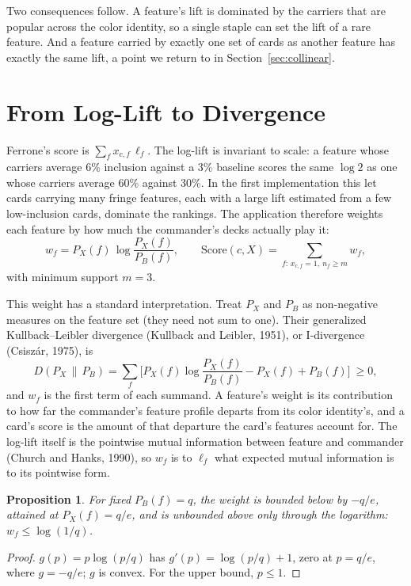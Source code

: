 \documentclass[11pt]{article}
\newtheorem{proposition}{Proposition}
\theoremstyle{remark}
\begin{document}
\noindent Two consequences follow. A feature's lift is dominated by the carriers
that are popular across the color identity, so a single staple can set the lift
of a rare feature. And a feature carried by exactly one set of cards as another
feature has exactly the same lift, a point we return to in
Section~\ref{sec:collinear}.

\section{From Log-Lift to Divergence}\label{sec:div}
\noindent Ferrone's score is $\sum_f x_{c,f}\,\ell_f$. The log-lift is invariant
to scale: a feature whose carriers average 6\% inclusion against a 3\% baseline
scores the same $\log 2$ as one whose carriers average 60\% against 30\%. In the
first implementation this let cards carrying many fringe features, each with a
large lift estimated from a few low-inclusion cards, dominate the rankings. The
application therefore weights each feature by how much the commander's decks
actually play it:
\begin{equation}\label{eq:weight}
  w_f = P_X(f)\,\log\frac{P_X(f)}{P_B(f)},\qquad
  \mathrm{Score}(c,X)=\sum_{f:\,x_{c,f}=1,\ n_f\ge m} w_f ,
\end{equation}
with minimum support $m=3$.

This weight has a standard interpretation. Treat $P_X$ and $P_B$ as non-negative
measures on the feature set (they need not sum to one). Their generalized
Kullback--Leibler divergence (Kullback and Leibler, 1951), or I-divergence
(Csisz\'ar, 1975), is
\begin{equation}\label{eq:idiv}
  D(P_X\,\|\,P_B)=\sum_f\Big[P_X(f)\log\frac{P_X(f)}{P_B(f)}-P_X(f)+P_B(f)\Big]\ \ge 0 ,
\end{equation}
and $w_f$ is the first term of each summand. A feature's weight is its
contribution to how far the commander's feature profile departs from its color
identity's, and a card's score is the amount of that departure the card's
features account for. The log-lift itself is the pointwise mutual information
between feature and commander (Church and Hanks, 1990), so $w_f$ is to $\ell_f$
what expected mutual information is to its pointwise form.

\begin{proposition}\label{prop:bound}
For fixed $P_B(f)=q$, the weight is bounded below by $-q/e$, attained at
$P_X(f)=q/e$, and is unbounded above only through the logarithm: $w_f\le
\log(1/q)$.
\end{proposition}
\begin{proof}
$g(p)=p\log(p/q)$ has $g'(p)=\log(p/q)+1$, zero at $p=q/e$, where $g=-q/e$; $g$ is
convex. For the upper bound, $p\le 1$.
\end{proof}
\end{document}

